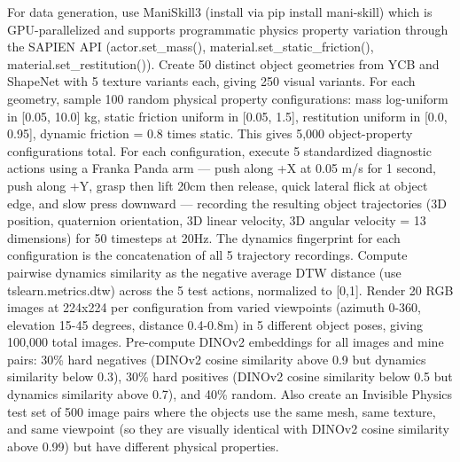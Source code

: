 \documentclass[11pt,a4paper]{article}
\begin{document}
For data generation, use ManiSkill3 (install via pip install mani-skill) which is GPU-parallelized and supports programmatic physics property variation through the SAPIEN API (actor.set\_mass(), material.set\_static\_friction(), material.set\_restitution()). Create 50 distinct object geometries from YCB and ShapeNet with 5 texture variants each, giving 250 visual variants. For each geometry, sample 100 random physical property configurations: mass log-uniform in [0.05, 10.0] kg, static friction uniform in [0.05, 1.5], restitution uniform in [0.0, 0.95], dynamic friction = 0.8 times static. This gives 5,000 object-property configurations total. For each configuration, execute 5 standardized diagnostic actions using a Franka Panda arm --- push along +X at 0.05 m/s for 1 second, push along +Y, grasp then lift 20cm then release, quick lateral flick at object edge, and slow press downward --- recording the resulting object trajectories (3D position, quaternion orientation, 3D linear velocity, 3D angular velocity = 13 dimensions) for 50 timesteps at 20Hz. The dynamics fingerprint for each configuration is the concatenation of all 5 trajectory recordings. Compute pairwise dynamics similarity as the negative average DTW distance (use tslearn.metrics.dtw) across the 5 test actions, normalized to [0,1]. Render 20 RGB images at 224x224 per configuration from varied viewpoints (azimuth 0-360, elevation 15-45 degrees, distance 0.4-0.8m) in 5 different object poses, giving 100,000 total images. Pre-compute DINOv2 embeddings for all images and mine pairs: 30\% hard negatives (DINOv2 cosine similarity above 0.9 but dynamics similarity below 0.3), 30\% hard positives (DINOv2 cosine similarity below 0.5 but dynamics similarity above 0.7), and 40\% random. Also create an Invisible Physics test set of 500 image pairs where the objects use the same mesh, same texture, and same viewpoint (so they are visually identical with DINOv2 cosine similarity above 0.99) but have different physical properties.
\end{document}
